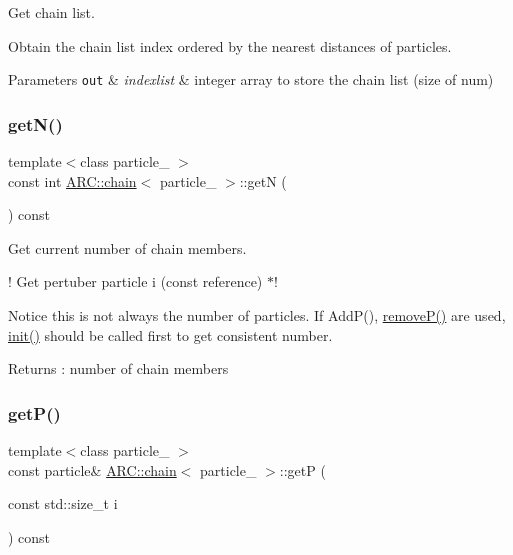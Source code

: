 Get chain list. 

Obtain the chain list index ordered by the nearest distances of particles. 
\begin{DoxyParams}[1]{Parameters}
\mbox{\tt out}  & {\em indexlist} & integer array to store the chain list (size of num) \\
\hline
\end{DoxyParams}
\hypertarget{classARC_1_1chain_a6069646256b45896e6395205826ad05f}{}\label{classARC_1_1chain_a6069646256b45896e6395205826ad05f} 
\subsubsection{\texorpdfstring{get\+N()}{getN()}}
{\footnotesize\ttfamily template$<$class particle\+\_\+ $>$ \\
const int \hyperlink{classARC_1_1chain}{A\+R\+C\+::chain}$<$ particle\+\_\+ $>$\+::getN (\begin{DoxyParamCaption}{ }\end{DoxyParamCaption}) const\hspace{0.3cm}{\ttfamily [inline]}}



Get current number of chain members. 

! Get pertuber particle i (const reference) $\ast$!

Notice this is not always the number of particles. If Add\+P(), \hyperlink{classARC_1_1chain_ab19c57af30f8eebd5dfac3de2cab2ade}{remove\+P()} are used, \hyperlink{classARC_1_1chain_a9ddc18539223abcb6451805abc15aea9}{init()} should be called first to get consistent number. \begin{DoxyReturn}{Returns}
\+: number of chain members 
\end{DoxyReturn}
\hypertarget{classARC_1_1chain_ae6fa4b4a95b1caff98b55ebc5964e956}{}\label{classARC_1_1chain_ae6fa4b4a95b1caff98b55ebc5964e956} 
\subsubsection{\texorpdfstring{get\+P()}{getP()}}
{\footnotesize\ttfamily template$<$class particle\+\_\+ $>$ \\
const particle\& \hyperlink{classARC_1_1chain}{A\+R\+C\+::chain}$<$ particle\+\_\+ $>$\+::getP (\begin{DoxyParamCaption}\item[{const std\+::size\+\_\+t}]{i }\end{DoxyParamCaption}) const\hspace{0.3cm}{\ttfamily [inline]}}



